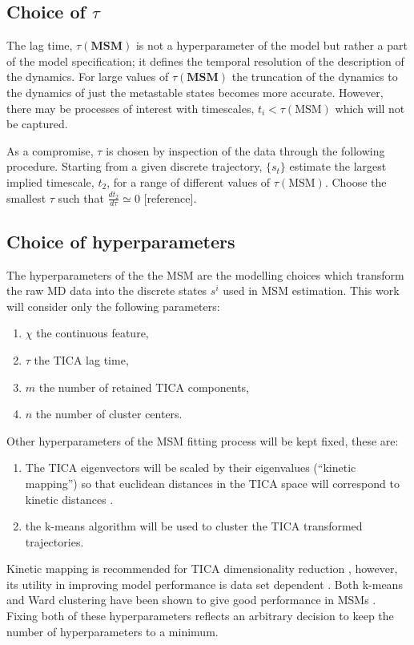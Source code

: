\subsection{Choice of $\tau$}
The lag time, $\tau(\mathbf{MSM})$ is not a hyperparameter of the model but rather a part of the model specification; it defines the temporal resolution of the description of the dynamics. For large values of $\tau(\mathbf{MSM})$ the truncation of the dynamics to the dynamics of just the metastable states becomes more accurate. However, there may be processes of interest with timescales, $t_{i}<\tau(\mathrm{MSM})$ which will not be captured.

As a compromise, $\tau$ is chosen by inspection of the data through the following procedure. Starting from a given discrete trajectory, $\{s_{t}\}$ estimate the largest implied timescale, $t_{2}$, for a range of different values of $\tau(\mathrm{MSM})$. Choose the smallest $\tau$ such that $\frac{d t_{2}}{d \tau} \simeq 0$ [reference]. 

\subsection{Choice of hyperparameters}
The hyperparameters of the the MSM are the modelling choices which transform the raw MD data into the discrete states $s^{i}$ used in MSM estimation. This work will consider only the following parameters: 
\begin{enumerate}
    \item $\chi$ the continuous feature, 
    \item $\tau$ the TICA lag time, 
    \item $m$ the number of retained TICA components, 
    \item $n$ the number of cluster centers. 
\end{enumerate}
Other hyperparameters of the MSM fitting process will be kept fixed, these are: 
\begin{enumerate}
    \item The TICA eigenvectors will be scaled by their eigenvalues (``kinetic mapping'') so that euclidean distances in the TICA space will correspond to kinetic distances \cite{noeKineticDistanceKinetic2015}.
    \item the k-means algorithm will be used to cluster the TICA transformed trajectories. 
\end{enumerate}
Kinetic mapping is recommended for TICA dimensionality reduction \cite{noeKineticDistanceKinetic2015}, however, its utility in improving model performance is data set dependent \cite{husicOptimizedParameterSelection2016}.  Both k-means and Ward clustering have been shown to give good performance in MSMs \cite{husicWardClusteringImproves2017a}. Fixing both of these hyperparameters reflects an arbitrary decision to keep the number of hyperparameters to a minimum.

